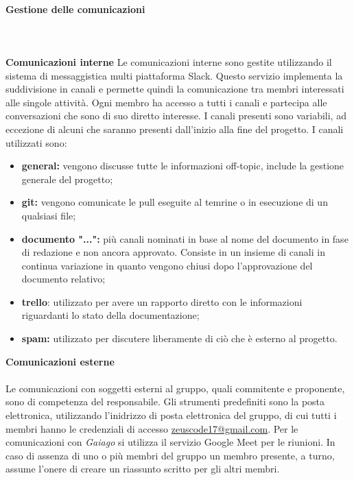 			\paragraph{Gestione delle comunicazioni} \mbox{}\\ \mbox{}\\
			\textbf{Comunicazioni interne} \newline \newline
			Le comunicazioni interne sono gestite utilizzando il sistema di messaggistica multi piattaforma Slack\glo. Questo servizio implementa la suddivisione in canali e permette quindi la comunicazione tra membri interessati alle singole attività. Ogni membro ha accesso a tutti i canali e partecipa alle conversazioni che sono di suo diretto interesse. I canali presenti sono variabili, ad eccezione di alcuni che saranno presenti dall'inizio alla fine del progetto.
			I canali utilizzati sono:
			\begin{itemize}
				\item \textbf{general:} vengono discusse tutte le informazioni off-topic\glosp, include la gestione generale del progetto;
				\item \textbf{git:} vengono comunicate le pull eseguite al temrine o in esecuzione di un qualsiasi file;
				\item \textbf{documento "...":} più canali nominati in base al nome del documento in fase di redazione e non ancora approvato. Consiste in un insieme di canali in continua variazione in quanto vengono chiusi dopo l'approvazione del documento relativo;
				\item \textbf{trello}: utilizzato per avere un rapporto diretto con le informazioni riguardanti lo stato della documentazione;
				\item \textbf{spam:} utilizzato per discutere liberamente di ciò che è esterno al progetto.
			\end{itemize}
			\textbf{Comunicazioni esterne} \mbox{}\\ \mbox{}\\
			Le comunicazioni con soggetti esterni al gruppo, quali commitente e proponente, sono di competenza del responsabile. Gli strumenti predefiniti sono la posta elettronica, utilizzando l'inidrizzo di posta elettronica del gruppo, di cui tutti i membri hanno le credenziali di accesso  \url{zeuscode17@gmail.com}.
			Per le comunicazioni con \textit{Gaiago} si utilizza il servizio Google Meet per le riunioni. In caso di assenza di uno o più membri del gruppo un membro presente, a turno, assume l'onere di creare un riassunto scritto per gli altri membri.
			\newline
